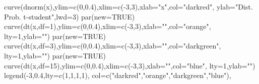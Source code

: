 \documentclass[
  letterpaper,
  DIV=11,
  numbers=noendperiod]{scrartcl}
\newenvironment{Shaded}{\begin{snugshade}}{\end{snugshade}}
\newcommand{\AttributeTok}[1]{\textcolor[rgb]{0.40,0.45,0.13}{#1}}
\newcommand{\ConstantTok}[1]{\textcolor[rgb]{0.56,0.35,0.01}{#1}}
\newcommand{\DecValTok}[1]{\textcolor[rgb]{0.68,0.00,0.00}{#1}}
\newcommand{\FloatTok}[1]{\textcolor[rgb]{0.68,0.00,0.00}{#1}}
\newcommand{\FunctionTok}[1]{\textcolor[rgb]{0.28,0.35,0.67}{#1}}
\newcommand{\NormalTok}[1]{\textcolor[rgb]{0.00,0.23,0.31}{#1}}
\newcommand{\SpecialCharTok}[1]{\textcolor[rgb]{0.37,0.37,0.37}{#1}}
\newcommand{\StringTok}[1]{\textcolor[rgb]{0.13,0.47,0.30}{#1}}
\begin{document}
\begin{Shaded}
\begin{Highlighting}[]
\FunctionTok{curve}\NormalTok{(}\FunctionTok{dnorm}\NormalTok{(x),}\AttributeTok{ylim=}\FunctionTok{c}\NormalTok{(}\DecValTok{0}\NormalTok{,}\FloatTok{0.4}\NormalTok{),}\AttributeTok{xlim=}\FunctionTok{c}\NormalTok{(}\SpecialCharTok{{-}}\DecValTok{3}\NormalTok{,}\DecValTok{3}\NormalTok{),}\AttributeTok{xlab=}\StringTok{"x"}\NormalTok{,}\AttributeTok{col=}\StringTok{"darkred"}\NormalTok{,}
      \AttributeTok{ylab=}\StringTok{"Dist. Prob. t{-}student"}\NormalTok{,}\AttributeTok{lwd=}\DecValTok{3}\NormalTok{)}
\FunctionTok{par}\NormalTok{(}\AttributeTok{new=}\ConstantTok{TRUE}\NormalTok{)}
\FunctionTok{curve}\NormalTok{(}\FunctionTok{dt}\NormalTok{(x,}\AttributeTok{df=}\DecValTok{1}\NormalTok{),}\AttributeTok{ylim=}\FunctionTok{c}\NormalTok{(}\DecValTok{0}\NormalTok{,}\FloatTok{0.4}\NormalTok{),}\AttributeTok{xlim=}\FunctionTok{c}\NormalTok{(}\SpecialCharTok{{-}}\DecValTok{3}\NormalTok{,}\DecValTok{3}\NormalTok{),}\AttributeTok{xlab=}\StringTok{""}\NormalTok{,}\AttributeTok{col=}\StringTok{"orange"}\NormalTok{,}
      \AttributeTok{lty=}\DecValTok{1}\NormalTok{,}\AttributeTok{ylab=}\StringTok{""}\NormalTok{)}
\FunctionTok{par}\NormalTok{(}\AttributeTok{new=}\ConstantTok{TRUE}\NormalTok{)}
\FunctionTok{curve}\NormalTok{(}\FunctionTok{dt}\NormalTok{(x,}\AttributeTok{df=}\DecValTok{3}\NormalTok{),}\AttributeTok{ylim=}\FunctionTok{c}\NormalTok{(}\DecValTok{0}\NormalTok{,}\FloatTok{0.4}\NormalTok{),}\AttributeTok{xlim=}\FunctionTok{c}\NormalTok{(}\SpecialCharTok{{-}}\DecValTok{3}\NormalTok{,}\DecValTok{3}\NormalTok{),}\AttributeTok{xlab=}\StringTok{""}\NormalTok{,}\AttributeTok{col=}\StringTok{"darkgreen"}\NormalTok{,}
      \AttributeTok{lty=}\DecValTok{1}\NormalTok{,}\AttributeTok{ylab=}\StringTok{""}\NormalTok{)}
\FunctionTok{par}\NormalTok{(}\AttributeTok{new=}\ConstantTok{TRUE}\NormalTok{)}
\FunctionTok{curve}\NormalTok{(}\FunctionTok{dt}\NormalTok{(x,}\AttributeTok{df=}\DecValTok{15}\NormalTok{),}\AttributeTok{ylim=}\FunctionTok{c}\NormalTok{(}\DecValTok{0}\NormalTok{,}\FloatTok{0.4}\NormalTok{),}\AttributeTok{xlim=}\FunctionTok{c}\NormalTok{(}\SpecialCharTok{{-}}\DecValTok{3}\NormalTok{,}\DecValTok{3}\NormalTok{),}\AttributeTok{xlab=}\StringTok{""}\NormalTok{,}\AttributeTok{col=}\StringTok{"blue"}\NormalTok{,}
      \AttributeTok{lty=}\DecValTok{1}\NormalTok{,}\AttributeTok{ylab=}\StringTok{""}\NormalTok{) }
\FunctionTok{legend}\NormalTok{(}\SpecialCharTok{{-}}\DecValTok{3}\NormalTok{,}\FloatTok{0.4}\NormalTok{,}\AttributeTok{lty=}\FunctionTok{c}\NormalTok{(}\DecValTok{1}\NormalTok{,}\DecValTok{1}\NormalTok{,}\DecValTok{1}\NormalTok{,}\DecValTok{1}\NormalTok{), }\AttributeTok{col=}\FunctionTok{c}\NormalTok{(}\StringTok{"darkred"}\NormalTok{,}\StringTok{"orange"}\NormalTok{,}\StringTok{"darkgreen"}\NormalTok{,}\StringTok{"blue"}\NormalTok{),}

\end{Highlighting}
\end{Shaded}
\end{document}
